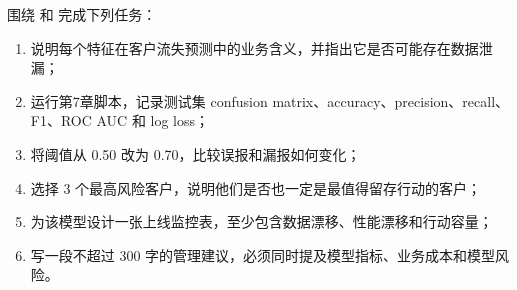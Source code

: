 \begin{exercise}
围绕  和  完成下列任务：
\begin{enumerate}
  \item 说明每个特征在客户流失预测中的业务含义，并指出它是否可能存在数据泄漏；
  \item 运行第7章脚本，记录测试集 confusion matrix、accuracy、precision、recall、F1、ROC AUC 和 log loss；
  \item 将阈值从 0.50 改为 0.70，比较误报和漏报如何变化；
  \item 选择 3 个最高风险客户，说明他们是否也一定是最值得留存行动的客户；
  \item 为该模型设计一张上线监控表，至少包含数据漂移、性能漂移和行动容量；
  \item 写一段不超过 300 字的管理建议，必须同时提及模型指标、业务成本和模型风险。
\end{enumerate}
\end{exercise}
